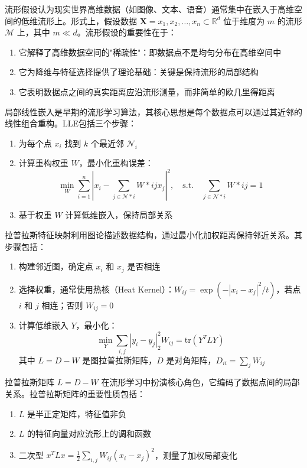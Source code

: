 \documentclass[12pt,a4paper,UTF8]{article}
\begin{document}
  流形假设认为现实世界高维数据（如图像、文本、语音）通常集中在嵌入于高维空间的低维流形上。形式上，假设数据 $\mathbf{X} = {x_1, x_2, \ldots, x_n} \subset \mathbb{R}^d$ 位于维度为 $m$ 的流形 $\mathcal{M}$ 上，其中 $m \ll d$。流形假设的重要性在于：
  
   \begin{enumerate}
  	\item 它解释了高维数据空间的"稀疏性"：即数据点不是均匀分布在高维空间中
  	\item 它为降维与特征选择提供了理论基础：关键是保持流形的局部结构
  	\item  它表明数据点之间的真实距离应沿流形测量，而非简单的欧几里得距离
  \end{enumerate}
   
  
  局部线性嵌入是早期的流形学习算法，其核心思想是每个数据点可以通过其近邻的线性组合重构。LLE包括三个步骤：
  
  \begin{enumerate}
  	\item 为每个点 $x_i$ 找到 $k$ 个最近邻 $\mathcal{N}_i$
  	\item 计算重构权重 $W$，最小化重构误差： $$\min_{W} \sum_{i=1}^{n} |x_i - \sum_{j \in \mathcal{N}*i} W*{ij}x_j|^2, \quad \text{s.t.} \quad \sum_{j \in \mathcal{N}*i} W*{ij} = 1$$
  	\item  基于权重 $W$ 计算低维嵌入，保持局部关系
  \end{enumerate}
  
  
  拉普拉斯特征映射利用图论描述数据结构，通过最小化加权距离保持邻近关系。其步骤包括：
  
   \begin{enumerate}
  	\item 构建邻近图，确定点 $x_i$ 和 $x_j$ 是否相连
  	\item 选择权重，通常使用热核（Heat Kernel）：$W_{ij} = \exp(-|x_i - x_j|^2/t)$，若点 $i$ 和 $j$ 相连；否则 $W_{ij} = 0$
  	\item  计算低维嵌入 $Y$，最小化： $$\min_{Y} \sum_{i,j} |y_i - y_j|^2_2 W_{ij} = \text{tr}(Y^T L Y)$$ 其中 $L = D - W$ 是图拉普拉斯矩阵，$D$ 是对角矩阵，$D_{ii} = \sum_j W_{ij}$
  \end{enumerate}
  
  
  拉普拉斯矩阵 $L = D - W$ 在流形学习中扮演核心角色，它编码了数据点间的局部关系。拉普拉斯矩阵的重要性质包括：
  
  \begin{enumerate}
  	\item $L$ 是半正定矩阵，特征值非负
  	\item $L$ 的特征向量对应流形上的调和函数
  	\item  二次型 $x^T L x = \frac{1}{2} \sum_{i,j} W_{ij} (x_i - x_j)^2$，测量了加权局部变化
  \end{enumerate}
\end{document}
